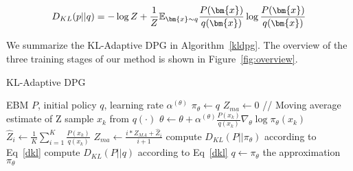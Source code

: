 \begin{equation}\label{dkl}
    \small
    D_{KL}(p||q) = -\log Z + \frac{1}{Z} \mathbb{E}_{\bm{x} \sim q}\frac{P(\bm{x})}{q(\bm{x})}\log\frac{P(\bm{x})}{q(\bm{x})}
\end{equation}

We summarize the KL-Adaptive DPG in Algorithm~\ref{kldpg}. The overview of the three
training stages of our method is shown in Figure~\ref{fig:overview}.%




\begin{algorithm}[t]
\small
\caption{KL-Adaptive DPG}
\label{kldpg}
\begin{algorithmic}[1]
\REQUIRE EBM $P$, initial policy $q$, learning rate $\alpha^{(\theta)}$
\STATE $\pi_\theta \leftarrow q$
\STATE $Z_{ma} \leftarrow 0$ \hfill // Moving average estimate of Z
        \STATE sample $x_k$ from $q(\cdot)$
        \STATE $\theta \leftarrow \theta+\alpha^{(\theta)}\frac{P(x_k)}{q(x_k)}\nabla_\theta\log\pi_\theta(x_k)$
    \ENDFOR
    \STATE $\hat{Z}_i \leftarrow \frac{1}{K}\sum_{i=1}^{K}\frac{P(x_k)}{q(x_k)}$
    \STATE $Z_{ma}\leftarrow \frac{i * Z_{MA} + \hat{Z}_i}{i+1}$
    \STATE compute $D_{KL}(P||\pi_\theta)$ according to Eq~\ref{dkl}
    \STATE compute $D_{KL}(P||q)$ according to Eq~\ref{dkl}
        \STATE $q \leftarrow \pi_\theta$
    \ENDIF
\ENDFOR
\ENSURE the approximation $\pi_\theta$
\end{algorithmic}
\end{algorithm}
